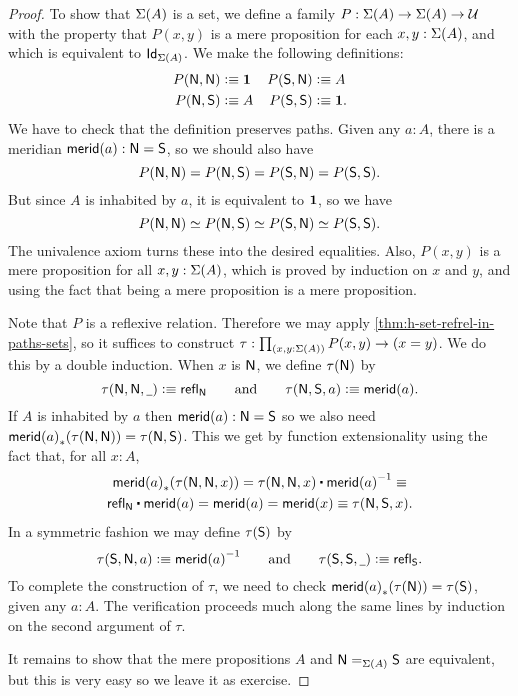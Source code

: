 \begin{proof}
To show that $\susp(A)$ is a set, we define a
family $P:\susp(A)\to\susp(A)\to\type$ with the 
property that $P(x,y)$ is a mere proposition for each $x,y:\susp(A)$,
and which is equivalent to $\idtypevar{\susp(A)}$.
%
We make the following definitions:
\begin{align*}
P(\north,\north) & \defeq \unit &
P(\south,\north) & \defeq A\\
P(\north,\south) & \defeq A &
P(\south,\south) & \defeq \unit.
\end{align*}
We have to check that the definition preserves paths.
Given any $a : A$, there is a meridian $\merid(a) : \north = \south$,
so we should also have
%
\begin{equation*}
  P(\north, \north) = P(\north, \south) = P(\south, \north) = P(\south, \south).
\end{equation*}
%
But since $A$ is inhabited by $a$, it is equivalent to $\unit$, so we have
%
\begin{equation*}
  P(\north, \north) \simeq P(\north, \south) \simeq P(\south, \north) \simeq P(\south, \south).
\end{equation*}
%
The univalence axiom turns these into the desired equalities. Also, $P(x,y)$ is a mere
proposition for all $x, y : \susp(A)$, which is proved by induction on $x$ and $y$, and
using the fact that being a mere proposition is a mere proposition.

Note that $P$ is a reflexive relation.
Therefore we may apply \autoref{thm:h-set-refrel-in-paths-sets}, so it suffices to
construct $\tau : \prd{x,y:\susp(A)}P(x,y)\to(x=y)$. We do this by a double induction.
When $x$ is $\north$, we define $\tau(\north)$ by
%
\begin{equation*}
  \tau(\north,\north, \blank) \defeq \refl{\north}
  \qquad\text{and}\qquad
  \tau(\north,\south,a) \defeq \merid(a).
\end{equation*}
%
If $A$ is inhabited by $a$ then $\merid(a) : \north = \south$ so we also need $\trans{\merid(a)}{\tau(\north, \north)} =
\tau(\north, \south)$. This we get by function extensionality using the fact that, for all $x : A$,
%
\begin{multline*}
  \trans{\merid(a)}{\tau(\north,\north,x)} =
  \tau(\north,\north,x) \ct \opp{\merid(a)} \jdeq \\
  \refl{\north} \ct \merid(a) =
  \merid(a) =
  \merid(x) \jdeq
  \tau(\north, \south, x).
\end{multline*}
In a symmetric fashion we may define $\tau(\south)$ by
%
\begin{equation*}
  \tau(\south,\north, a) \defeq \opp{\merid(a)}
  \qquad\text{and}\qquad
  \tau(\south,\south, \blank) \defeq \refl{\south}.
\end{equation*}
%
To complete the construction of $\tau$, we need to check $\trans{\merid(a)}{\tau(\north)} = \tau(\south)$,
given any $a : A$. The verification proceeds much along the same lines by induction on the
second argument of $\tau$.

It remains to show that the mere propositions $A$ and $\id[\susp(A)]{\north}{\south}$ are
equivalent, but this is very easy so we leave it as exercise.
\end{proof}

